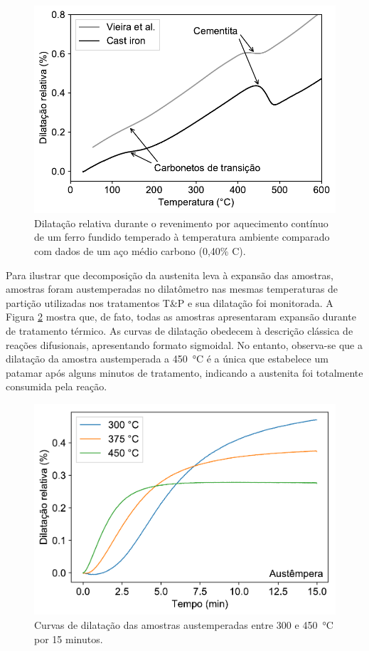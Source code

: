 \begin{figure}
  \centering
  \includegraphics[width=.8\textwidth]{img/dilatometria/dil_extra.pdf}
  \caption{Dilatação relativa durante o revenimento por aquecimento contínuo de um ferro fundido temperado à temperatura ambiente comparado com dados de um aço médio carbono (0,40\% C)\cite{Vieira2017}.}
  \label{fig:dilExtra}
\end{figure}

Para ilustrar que decomposição da austenita leva à expansão das amostras, amostras foram austemperadas no dilatômetro nas mesmas temperaturas de partição utilizadas nos tratamentos T\&P e sua dilatação foi monitorada. A Figura \ref{fig:austempera} mostra que, de fato, todas as amostras apresentaram expansão durante de tratamento térmico. As curvas de dilatação obedecem à descrição clássica de reações difusionais, apresentando formato sigmoidal. No entanto, observa-se que a dilatação da amostra austemperada a \SI{450}{\degreeCelsius} é a única que estabelece um patamar após alguns minutos de tratamento, indicando a austenita foi totalmente consumida pela reação.

\begin{figure}
  \includegraphics[width=.8\textwidth]{img/dilatometria/dlxt_austempera.pdf}
  \caption{Curvas de dilatação das amostras austemperadas entre 300 e \SI{450}{\degreeCelsius} por 15 minutos.}
  \label{fig:austempera}
\end{figure}

